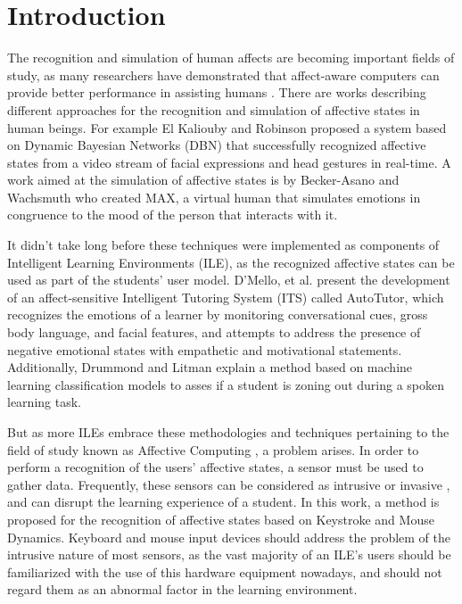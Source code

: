 \documentclass[runningheads,a4paper]{llncs}
\begin{document}
\section{Introduction}
 
The recognition and simulation of human affects are becoming important fields of study, as many researchers have demonstrated that affect-aware computers can provide better performance in assisting humans \cite{affective-computing}. There are works describing different approaches for the recognition and simulation of affective states in human beings. For example El Kaliouby and Robinson \cite{facial-expressions} proposed a system based on Dynamic Bayesian Networks (DBN) that successfully recognized affective states from a video stream of facial expressions and head gestures in real-time. A work aimed at the simulation of affective states is by Becker-Asano and Wachsmuth \cite{affective-simulation} who created MAX, a virtual human that simulates emotions in congruence to the mood of the person that interacts with it.

It didn't take long before these techniques were implemented as components of Intelligent Learning Environments (ILE), as the recognized affective states can be used as part of the students' user model. D'Mello, et al. \cite{autotutor} present the development of an affect-sensitive Intelligent Tutoring System (ITS) called AutoTutor, which recognizes the emotions of a learner by monitoring conversational cues, gross body language, and facial features, and attempts to address the presence of negative emotional states with empathetic and motivational statements. Additionally, Drummond and Litman \cite{zoning-out} explain a method based on machine learning classification models to asses if a student is zoning out during a spoken learning task.

But as more ILEs embrace these methodologies and techniques pertaining to the field of study known as Affective Computing \cite{affective-computing}, a problem arises. In order to perform a recognition of the users' affective states, a sensor must be used to gather data. Frequently, these sensors can be considered as intrusive or invasive \cite{intrusive1} \cite{intrusive2} \cite{intrusive3}, and can disrupt the learning experience of a student. In this work, a method is proposed for the recognition of affective states based on Keystroke and Mouse Dynamics. Keyboard and mouse input devices should address the problem of the intrusive nature of most sensors, as the vast majority of an ILE's users should be familiarized with the use of this hardware equipment nowadays, and should not regard them as an abnormal factor in the learning environment.
\end{document}
